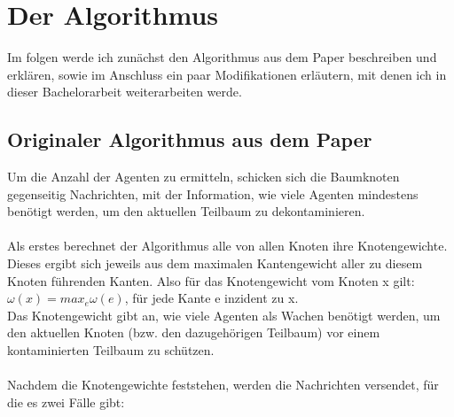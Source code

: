\section{Der Algorithmus}
Im folgen werde ich zunächst den Algorithmus aus dem Paper beschreiben und erklären, sowie im Anschluss ein paar Modifikationen erläutern, mit denen ich in dieser Bachelorarbeit weiterarbeiten werde.



\subsection{Originaler Algorithmus aus dem Paper}\label{paperAlgoChapter}
Um die Anzahl der Agenten zu ermitteln, schicken sich die Baumknoten gegenseitig Nachrichten, mit der Information, wie viele Agenten mindestens benötigt werden, um den aktuellen Teilbaum zu dekontaminieren.
\\
\\
Als erstes berechnet der Algorithmus alle von allen Knoten ihre Knotengewichte. Dieses ergibt sich jeweils aus dem maximalen Kantengewicht aller zu diesem Knoten führenden Kanten. Also für das Knotengewicht vom Knoten x gilt: $\omega(x) = max_{e} \omega(e)$, für jede Kante e inzident zu x.
\\
Das Knotengewicht gibt an, wie viele Agenten als Wachen benötigt werden, um den aktuellen Knoten (bzw. den dazugehörigen Teilbaum) vor einem kontaminierten Teilbaum zu schützen.
\\
\\
Nachdem die Knotengewichte feststehen, werden die Nachrichten versendet, für die es zwei Fälle gibt:


